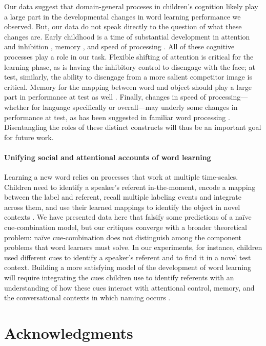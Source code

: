 \documentclass[man,floatsintext]{apa6}
\begin{document}
Our data suggest that domain-general proceses in children's cognition likely play a large part in the developmental changes in word learning performance we observed. But, our data do not speak directly to the question of what these changes are. Early childhood is a time of substantial development in attention and inhibition \cite{smith1999b,diamond1989}, memory \cite{cowan1997}, and speed of processing \cite{kail1991,dougherty1997}. All of these cognitive processes play a role in our task. Flexible shifting of attention is critical for the learning phase, as is having the inhibitory control to disengage with the face; at test, similarly, the ability to disengage from a more salient competitor image is critical. Memory for the mapping between word and object should play a large part in performance at test as well \cite{Horst2008}. Finally, changes in speed of processing---whether for language specifically or overall---may underly some changes in performance at test, as has been suggested in familiar word processing \cite{fernald1998,fernald2006}. Disentangling the roles of these distinct constructs will thus be an important goal for future work. 

\paragraph{Unifying social and attentional accounts of word learning}

Learning a new word relies on processes that work at multiple time-scales. Children need to identify a speaker's referent in-the-moment, encode a mapping between the label and referent, recall multiple labeling events and integrate across them, and use their learned mappings to identify the object in novel contexts \cite{Frank2009a,McMurray2012, Yu2012b}. We have presented data here that falsify some predictions of a na\"ive cue-combination model, but our critiques converge with a broader theoretical problem: na\"{i}ve cue-combination does not distinguish among the component problems that word learners must solve. In our experiments, for instance, children used different cues to identify a speaker's referent and to find it in a novel test context. Building a more satisfying model of the development of word learning will require integrating the cues children use to identify referents with an understanding of how these cues interact with attentional control, memory, and the conversational contexts in which naming occurs \cite{Frank2013a, Yurovsky2013c}.

\section{Acknowledgments}
\end{document}
